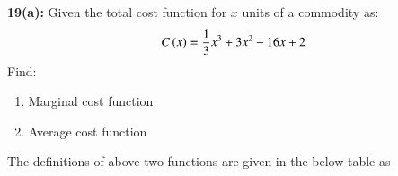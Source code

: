 \documentclass[journal,12pt,twocolumn]{IEEEtran}
\begin{document}
\textbf{19(a):} 
   Given the total cost function for $x$ units of a commodity as:
\begin{align*}
  C\left(x\right) = \frac{1}{3}x^3 + 3x^2 - 16x +2
\end{align*}
   Find:
\begin{enumerate}[ label=(\roman*)]
\item Marginal cost function
\item Average cost function
\end{enumerate}

\solution 
The definitions of above two functions are given in the below table as
\begin{table}[!htb]
\centering

\caption{}
\label{table:Table}
\end{table} \\
\end{document}
